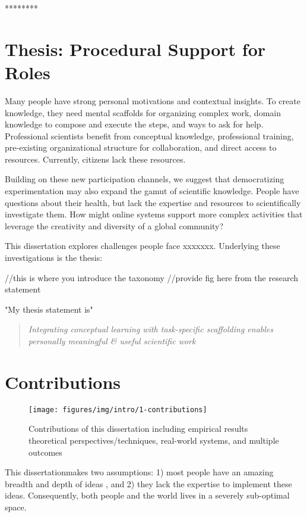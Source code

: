 ********
\section{Thesis: Procedural Support for Roles}

Many people have strong personal motivations and contextual insights. To create knowledge,
they need mental scaffolds for organizing complex work, domain knowledge to compose and
execute the steps, and ways to ask for help. Professional scientists benefit from conceptual
knowledge, professional training, pre-existing organizational structure for collaboration, and direct access to resources. Currently, citizens lack these resources.

Building on these new participation channels, we suggest that democratizing experimentation may
also expand the gamut of scientific knowledge. People have questions about their health, but lack
the expertise and resources to scientifically investigate them. How might online systems support
more complex activities that leverage the creativity and diversity of a global community?

This dissertation explores challenges people face xxxxxxx. Underlying these investigations is the thesis:

//this is where you introduce the taxonomy 
//provide fig here from the research statement 

"My thesis statement is"
\begin{quote}
\emph{Integrating conceptual learning with task-specific scaffolding enables personally meaningful \& useful scientific work}
\end{quote}


\section{Contributions}
\begin{figure}[t!] 
  \centering
    \texttt{[image: figures/img/intro/1-contributions]}
  \caption[Contributions of this dissertation]
{Contributions of this dissertation including empirical results theoretical perspectives/techniques, real-world systems, and multiple outcomes}
  \label{fig:contributions}
\end{figure}

This dissertation\textquotesingle makes two assumptions: 1) most people have an amazing breadth and depth of ideas , and 2) they lack the expertise to implement these ideas. Consequently, both people and the world lives in a severely sub-optimal space.

